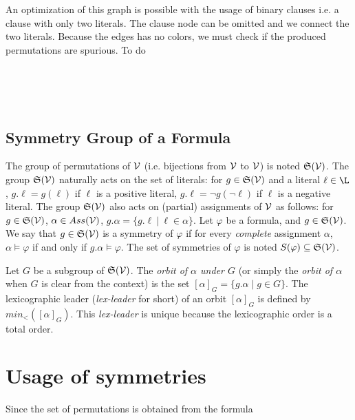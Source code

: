 An optimization of this graph is possible with the usage of binary clauses i.e. a clause with only two literals.
The clause node can be omitted and we connect the two literals. Because the edges has no colors, we must check
if the produced permutations are spurious. To do 

\\
\\
\\

 

\subsection{Symmetry Group of a Formula}

The group of permutations of $\mathcal{V}$ (i.e. bijections from $\mathcal{V}$ to $\mathcal{V}$) is noted
$\mathfrak{S}(\mathcal{V})$. The group $\mathfrak{S}(\mathcal{V})$ naturally acts on the set of literals: for $g
\in \mathfrak{S}(\mathcal{V})$ and a literal $\ell \in \L $, $g.\ell = g(\ell)$ if $\ell$ is a
positive literal, $g.\ell = \neg g(\neg \ell)$ if $\ell$ is a negative literal.
The group $\mathfrak{S}(\mathcal{V})$ also acts on (partial) assignments of $\mathcal{V}$ as follows: for
$g \in \mathfrak{S}(\mathcal{V})$, $\alpha \in Ass(\mathcal{V})$, $g.\alpha = \{ g.\ell ~|~ \ell \in \alpha \}$. Let
$\varphi$ be a formula, and $g \in \mathfrak{S}(\mathcal{V})$. We say that $g\in \mathfrak{S}(\mathcal{V})$ is a
symmetry of $ \varphi$ if for every \emph{complete} assignment $\alpha$, $\alpha
\models \varphi$ if and only if $g.\alpha \models \varphi$. The set of symmetries
of $\varphi$ is noted $S(\varphi) \subseteq \mathfrak{S}(\mathcal{V})$.

Let $G$ be a subgroup of $\mathfrak{S}(\mathcal{V})$. The \emph{orbit of $\alpha$ under $G$} (or
simply the \emph{orbit of $\alpha$} when $G$ is clear from the context) is the set
$ [\alpha]_G=\{ g.\alpha \mid g \in G \}$. The lexicographic leader
(\textit{lex-leader} for short) of an orbit $[\alpha]_G$ is defined by
$min_<([\alpha]_G)$. This \textit{lex-leader} is unique because the lexicographic
order is a total order.


\section{Usage of symmetries}

Since the set of permutations is obtained from the formula

